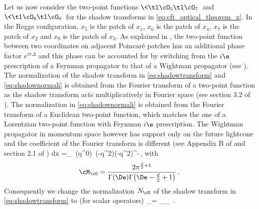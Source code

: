 Let us now consider the two-point functions $\<\tl \cO_5 \tl \cO_7\>$ and $\<\tl \cO_8 \tl \cO_6\>$ for the shadow transforms in \eqref{eq:cft_optical_theorem_x}.
In the Regge configuration, $x_5$ is the patch of $x_1$, $x_6$ is the patch of $x_4$, $x_7$ is the patch of $x_2$ and $x_8$ is the patch of $x_3$.
As explained in \cite{Cornalba:2007zb,Kravchuk:2018htv}, the two-point function between two coordinates on adjacent Poincar\'e patches has an additional phase factor $e^{i \pi \Delta}$ and this phase can be accounted for by switching from the $i\e$ prescription of a Feynman propagator to that of a Wightman propagator (see \cite{Cornalba:2007zb}).
The normalization of the shadow transform in \eqref{eq:shadowtransform} and \eqref{eq:shadownormali} is obtained from the Fourier transform of a two-point function as the shadow transform acts multiplicatively in Fourier space (see section 3.2 of \cite{Karateev:2018oml}). The normalization in \eqref{eq:shadownormali} is obtained from the Fourier transform of a Euclidean two-point function, which matches the one of a Lorentzian two-point function with Feynman $i\e$ prescription. The Wightman propagator in momentum space however has support only on the future lightcone and the coefficient of the Fourier transform is different (see Appendix B of \cite{Cornalba:2007zb} and
section 2.1 of \cite{Gillioz:2018mto})
\bea
\int dx  =\cM_{\cO}
\,\Theta(q^{0}) \,\Theta(-q^{2})\left(-q^{2}\right)^{\De-}\,,
with
\begin{equation}
	\cM_{\cO}  = \frac{2\pi^{\frac{d}{2}+1}}{\Gamma(\De)\Gamma\big(\De - \frac{d}{2} + 1\big)} \,.
\end{equation}
Consequently we change the normalization $N_\cO$ of the shadow transform in \eqref{eq:shadowtransform} to (for scalar operators)
\be
{}_\cO = \cM_\cO \cM_{\tl \cO}  \,.
\label{eq:new_normali}
\ee

